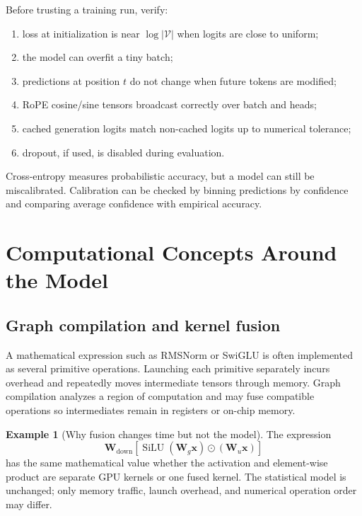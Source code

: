 \documentclass[11pt,a4paper]{article}
\theoremstyle{definition}
\newtheorem{example}{Example}[section]
\theoremstyle{plain}
\newcommand{\vx}{\bm{x}}
\newcommand{\mW}{\bm{W}}
\newcommand{\vocab}{|\mathcal{V}|}
\DeclareMathOperator{\SiLU}{SiLU}
\begin{document}
Before trusting a training run, verify:
\begin{enumerate}[nosep]
    \item loss at initialization is near $\log\vocab$ when logits are close to uniform;
    \item the model can overfit a tiny batch;
    \item predictions at position $t$ do not change when future tokens are modified;
    \item RoPE cosine/sine tensors broadcast correctly over batch and heads;
    \item cached generation logits match non-cached logits up to numerical tolerance;
    \item dropout, if used, is disabled during evaluation.
\end{enumerate}

Cross-entropy measures probabilistic accuracy, but a model can still be miscalibrated. Calibration can be checked by binning predictions by confidence and comparing average confidence with empirical accuracy.

\section{Computational Concepts Around the Model}
\label{sec:infrastructure}

\subsection{Graph compilation and kernel fusion}

A mathematical expression such as RMSNorm or SwiGLU is often implemented as several primitive operations. Launching each primitive separately incurs overhead and repeatedly moves intermediate tensors through memory. Graph compilation analyzes a region of computation and may fuse compatible operations so intermediates remain in registers or on-chip memory.

\begin{example}[Why fusion changes time but not the model]
The expression
\begin{equation*}
    \mW_{\mathrm{down}}\!\left[\SiLU(\mW_g\vx)\odot(\mW_u\vx)\right]
\end{equation*}
has the same mathematical value whether the activation and element-wise product are separate GPU kernels or one fused kernel. The statistical model is unchanged; only memory traffic, launch overhead, and numerical operation order may differ.
\end{example}
\end{document}
